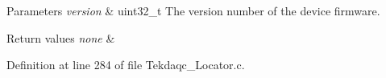 \begin{DoxyParams}{Parameters}
{\em version} & uint32\-\_\-t The version number of the device firmware. \\
\hline
\end{DoxyParams}

\begin{DoxyRetVals}{Return values}
{\em none} & \\
\hline
\end{DoxyRetVals}


Definition at line 284 of file Tekdaqc\-\_\-\-Locator.\-c.

